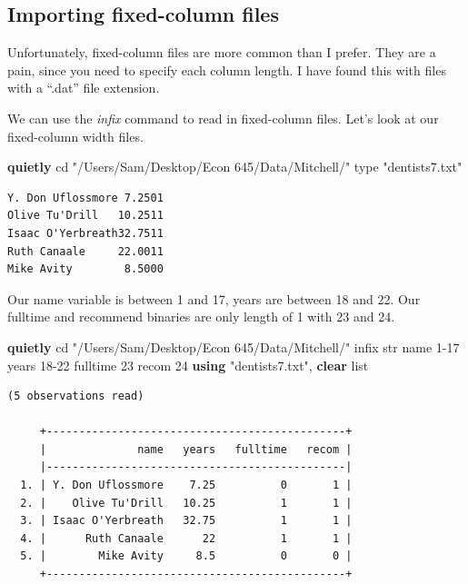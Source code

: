 \documentclass[
]{book}
\newenvironment{Shaded}{\begin{snugshade}}{\end{snugshade}}
\newcommand{\BaseNTok}[1]{\textcolor[rgb]{0.00,0.00,0.81}{#1}}
\newcommand{\DecValTok}[1]{\textcolor[rgb]{0.00,0.00,0.81}{#1}}
\newcommand{\KeywordTok}[1]{\textcolor[rgb]{0.13,0.29,0.53}{\textbf{#1}}}
\newcommand{\NormalTok}[1]{#1}
\newcommand{\OtherTok}[1]{\textcolor[rgb]{0.56,0.35,0.01}{#1}}
\newcommand{\StringTok}[1]{\textcolor[rgb]{0.31,0.60,0.02}{#1}}
\begin{document}
\subsection{Importing fixed-column files}\label{importing-fixed-column-files}

Unfortunately, fixed-column files are more common than I prefer. They are a pain, since you need to specify each column length. I have found this with files with a ``.dat'' file extension.

We can use the \emph{infix} command to read in fixed-column files. Let's look at our fixed-column width files.

\begin{Shaded}
\begin{Highlighting}[]
\KeywordTok{quietly}\NormalTok{ cd }\StringTok{"/Users/Sam/Desktop/Econ 645/Data/Mitchell/"}
\DecValTok{type} \StringTok{"dentists7.txt"}
\end{Highlighting}
\end{Shaded}

\begin{verbatim}
Y. Don Uflossmore 7.2501
Olive Tu'Drill   10.2511
Isaac O'Yerbreath32.7511
Ruth Canaale     22.0011
Mike Avity        8.5000
\end{verbatim}

Our name variable is between 1 and 17, years are between 18 and 22. Our fulltime and recommend binaries are only length of 1 with 23 and 24.

\begin{Shaded}
\begin{Highlighting}[]
\KeywordTok{quietly}\NormalTok{ cd }\StringTok{"/Users/Sam/Desktop/Econ 645/Data/Mitchell/"}
\NormalTok{infix str }\BaseNTok{name}\NormalTok{ 1{-}17 years 18{-}22 fulltime 23 recom 24 }\KeywordTok{using} \StringTok{"dentists7.txt"}\NormalTok{, }\KeywordTok{clear}
\OtherTok{list}
\end{Highlighting}
\end{Shaded}

\begin{verbatim}
(5 observations read)

     +----------------------------------------------+
     |              name   years   fulltime   recom |
     |----------------------------------------------|
  1. | Y. Don Uflossmore    7.25          0       1 |
  2. |    Olive Tu'Drill   10.25          1       1 |
  3. | Isaac O'Yerbreath   32.75          1       1 |
  4. |      Ruth Canaale      22          1       1 |
  5. |        Mike Avity     8.5          0       0 |
     +----------------------------------------------+
\end{verbatim}
\end{document}
